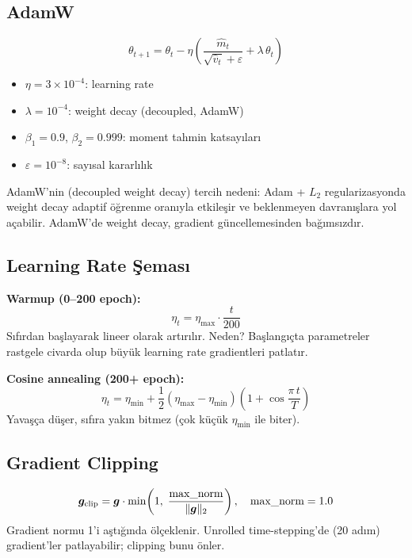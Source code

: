 \subsection{AdamW}

\begin{equation}
    \theta_{t+1} = \theta_t - \eta \left(\frac{\hat{m}_t}{\sqrt{\hat{v}_t} + \varepsilon} + \lambda \, \theta_t\right)
    \label{eq:adamw}
\end{equation}
\begin{itemize}
    \item $\eta = 3 \times 10^{-4}$: learning rate
    \item $\lambda = 10^{-4}$: weight decay (decoupled, AdamW)
    \item $\beta_1 = 0.9$, $\beta_2 = 0.999$: moment tahmin katsayıları
    \item $\varepsilon = 10^{-8}$: sayısal kararlılık
\end{itemize}

AdamW'nin (decoupled weight decay) tercih nedeni: Adam + $L_2$ regularizasyonda weight decay adaptif öğrenme oranıyla etkileşir ve beklenmeyen davranışlara yol açabilir. AdamW'de weight decay, gradient güncellemesinden bağımsızdır.

\subsection{Learning Rate Şeması}

\textbf{Warmup (0--200 epoch):}
\begin{equation}
    \eta_t = \eta_{\max} \cdot \frac{t}{200}
    \label{eq:warmup}
\end{equation}
Sıfırdan başlayarak lineer olarak artırılır. Neden? Başlangıçta parametreler rastgele civarda olup büyük learning rate gradientleri patlatır.

\textbf{Cosine annealing (200+ epoch):}
\begin{equation}
    \eta_t = \eta_{\min} + \frac{1}{2}(\eta_{\max} - \eta_{\min}) \left(1 + \cos\frac{\pi \, t}{T}\right)
    \label{eq:cosine_annealing}
\end{equation}
Yavaşça düşer, sıfıra yakın bitmez (çok küçük $\eta_{\min}$ ile biter).

\subsection{Gradient Clipping}
\begin{equation}
    \bm{g}_{\text{clip}} = \bm{g} \cdot \min\!\left(1, \; \frac{\text{max\_norm}}{\|\bm{g}\|_2}\right), \quad \text{max\_norm} = 1.0
    \label{eq:grad_clip}
\end{equation}
Gradient normu 1'i aştığında ölçeklenir. Unrolled time-stepping'de (20 adım) gradient'ler patlayabilir; clipping bunu önler.

